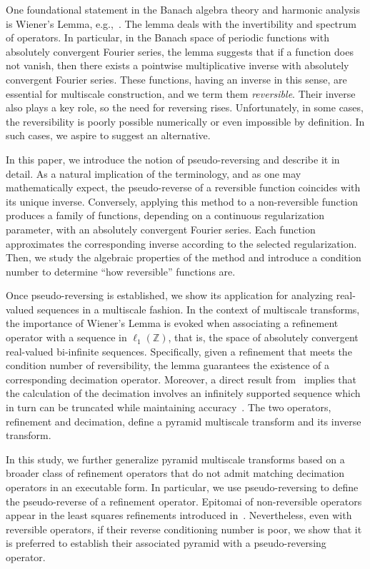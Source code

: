 \documentclass[12pt]{article}
\begin{document}
One foundational statement in the Banach algebra theory and harmonic analysis is Wiener's Lemma, e.g.,~\cite[Chapter 5]{grochenig2010wiener}. The lemma deals with the invertibility and spectrum of operators. In particular, in the Banach space of periodic functions with absolutely convergent Fourier series, the lemma suggests that if a function does not vanish, then there exists a pointwise multiplicative inverse with absolutely convergent Fourier series. These functions, having an inverse in this sense, are essential for multiscale construction, and we term them \emph{reversible}. Their inverse also plays a key role, so the need for reversing rises. Unfortunately, in some cases, the reversibility is poorly possible numerically or even impossible by definition. In such cases, we aspire to suggest an alternative.   

In this paper, we introduce the notion of pseudo-reversing and describe it in detail. As a natural implication of the terminology, and as one may mathematically expect, the pseudo-reverse of a reversible function coincides with its unique inverse. Conversely, applying this method to a non-reversible function produces a family of functions, depending on a continuous regularization parameter, with an absolutely convergent Fourier series. Each function approximates the corresponding inverse according to the selected regularization. Then, we study the algebraic properties of the method and introduce a condition number to determine ``how reversible'' functions are. 

Once pseudo-reversing is established, we show its application for analyzing real-valued sequences in a multiscale fashion. In the context of multiscale transforms, the importance of Wiener's Lemma is evoked when associating a refinement operator with a sequence in $\ell_1(\mathbb{Z})$, that is, the space of absolutely convergent real-valued bi-infinite sequences. Specifically, given a refinement that meets the condition number of reversibility, the lemma guarantees the existence of a corresponding decimation operator. Moreover, a direct result from~\cite{strohmer2002four} implies that the calculation of the decimation involves an infinitely supported sequence which in turn can be truncated while maintaining accuracy~\cite{mattar2023pyramid}. The two operators, refinement and decimation, define a pyramid multiscale transform and its inverse transform. 

In this study, we further generalize pyramid multiscale transforms based on a broader class of refinement operators that do not admit matching decimation operators in an executable form. In particular, we use pseudo-reversing to define the pseudo-reverse of a refinement operator. Epitomai of non-reversible operators appear in the least squares refinements introduced in~\cite{dyn2015univariate}. Nevertheless, even with reversible operators, if their reverse conditioning number is poor, we show that it is preferred to establish their associated pyramid with a pseudo-reversing operator.
\end{document}
